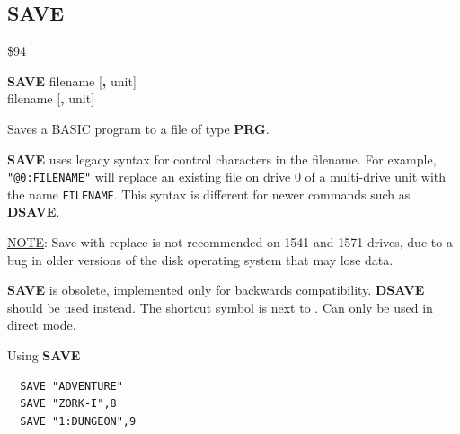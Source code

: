 \subsection{SAVE}
\begin{description}[leftmargin=2cm,style=nextline]
\item [Token:] \$94
\item [Format:] {\bf SAVE} filename [{\bf,} unit] \\
                \megakeywhite{$\leftarrow$} filename [{\bf,} unit]
\item [Usage:]
   Saves a BASIC program to a file of type {\bf PRG}.

   \filenamedefinition

   {\bf SAVE} uses legacy syntax for control characters in the filename. For example, \texttt{"@0:FILENAME"} will replace an existing file on drive 0 of a multi-drive unit with the name \texttt{FILENAME}. This syntax is different for newer commands such as {\bf DSAVE}.

   \underline{NOTE}: Save-with-replace is not recommended on 1541 and 1571 drives, due to a bug in older versions of the disk operating system that may lose data.

   \unitdefinition

\item [Remarks:] {\bf SAVE} is obsolete, implemented only for backwards compatibility.
                 {\bf DSAVE} should be used instead.
                 The shortcut symbol \megakeywhite{$\leftarrow$} is next to . Can only be used in direct mode.

\item [Examples:] Using {\bf SAVE}
\begin{tcolorbox}[colback=black,coltext=white]
\verbatimfont{\codefont}
\begin{verbatim}
  SAVE "ADVENTURE"
  SAVE "ZORK-I",8
  SAVE "1:DUNGEON",9
\end{verbatim}
\end{tcolorbox}
\end{description}


\newpage
